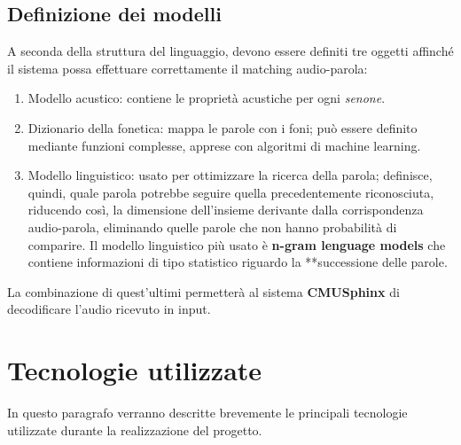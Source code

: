 \documentclass[12pt]{article}
\begin{document}
    \subsection {Definizione dei modelli}
    A seconda della struttura del linguaggio, devono essere definiti tre oggetti affinché il sistema possa effettuare correttamente il matching audio-parola:
        \begin{enumerate}
            \item Modello acustico: contiene le proprietà acustiche per ogni \textit{senone}.
            \item Dizionario della fonetica: mappa le parole con i foni; può essere definito mediante funzioni complesse, apprese con algoritmi di machine learning.
            \item Modello linguistico: usato per ottimizzare la ricerca della parola; definisce, quindi, quale parola potrebbe seguire quella precedentemente riconosciuta, riducendo così, la dimensione dell'insieme derivante dalla corrispondenza audio-parola, eliminando quelle parole che non hanno probabilità di comparire. Il modello linguistico più usato è \textbf{n-gram lenguage models} che contiene informazioni di tipo statistico riguardo la **successione delle parole.
        \end{enumerate}

    La combinazione di quest'ultimi permetterà al sistema \textbf{CMUSphinx} di decodificare l'audio ricevuto in input.
   

\newpage
\section{Tecnologie utilizzate}

    In questo paragrafo verranno descritte brevemente le principali tecnologie utilizzate durante la realizzazione del progetto.
    
\end{document}

